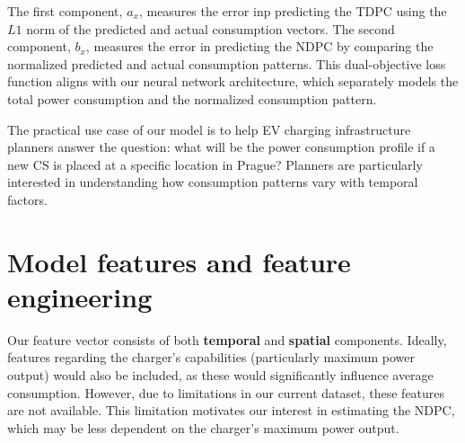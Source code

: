 
The first component, $a_x$, measures the error inp predicting the \acrfull{TDPC} using the $L1$ norm of the predicted and actual consumption vectors. The second component, $b_x$, measures the error in predicting the \acrfull{NDPC} by comparing the normalized predicted and actual consumption patterns. This dual-objective loss function aligns with our neural network architecture, which separately models the total power consumption and the normalized consumption pattern.


The practical use case of our model is to help EV charging infrastructure planners answer the question: what will be the power consumption profile if a new \acrfull{CS} is placed at a specific location in Prague? Planners are particularly interested in understanding how consumption patterns vary with temporal factors.

\section{Model features and feature engineering}

Our feature vector consists of both \textbf{temporal} and \textbf{spatial} components. Ideally, features regarding the charger's capabilities (particularly maximum power output) would also be included, as these would significantly influence average consumption. However, due to limitations in our current dataset, these features are not available. This limitation motivates our interest in estimating the \acrfull{NDPC}, which may be less dependent on the charger's maximum power output.


